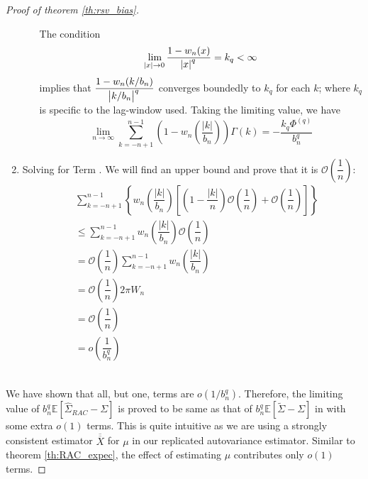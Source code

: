 \documentclass[12pt]{article}
\newcommand*\circled[1]{\tikz[baseline=(char.base)]{
            \node[shape=circle,draw,inner sep=2pt] (char) {#1};}}
\begin{document}
\begin{proof}[Proof of theorem \ref{th:rsv_bias}]
\begin{enumerate}
\begin{enumerate}
     The condition 
     \[
     \lim_{\abs{x}\to 0}\dfrac{1 - w_n(x)}{\abs{x}^q} = k_q < \infty
     \]
     implies that $\dfrac{1-w_n(k/b_n)}{\abs{k/b_n}^q}$ converges boundedly to $k_q$ for each $k$; where $k_q$ is specific to the lag-window used. Taking the limiting value, we have
     \[
     \lim_{n \to \infty}\sum_{k = -n+1}^{n-1}\left(1-w_n\left(\dfrac{|k|}{b_n}\right)\right)\Gamma(k) = -\dfrac{k_q \Phi^{(q)}}{b_n^q}
     \]
\end{enumerate}

 \item Solving for Term \circled{\textbf{B}}. We will find an upper bound and prove that it is $\mathcal{O}\left(\dfrac{1}{n}\right)$:
 \begin{align*}
     & \sum_{k=-n+1}^{n-1}\left\{w_n\left(\dfrac{|k|}{b_n}\right)\left[\left(1-\dfrac{|k|}{n}\right)\mathcal{O}\left(\dfrac{1}{n}\right) + \mathcal{O}\left(\dfrac{1}{n}\right) \right] \right\} \\
     &\leq \sum_{k=-n+1}^{n-1}w_n\left(\dfrac{|k|}{b_n}\right)\mathcal{O}\left(\dfrac{1}{n}\right)\\
     &= \mathcal{O}\left(\dfrac{1}{n}\right) \sum_{k=-n+1}^{n-1}w_n\left(\dfrac{|k|}{b_n}\right) \\
     &= \mathcal{O}\left(\dfrac{1}{n}\right) 2\pi W_n \\
     &= \mathcal{O}\left(\dfrac{1}{n}\right) \\
     &= o\left(\dfrac{1}{b_n^q}\right) 
 \end{align*}
 \end{enumerate}  
 \\
 We have shown that all, but one, terms are $o(1/b_n^q)$. Therefore, the limiting value of $b_n^q\mathbb{E}[\hat{\Sigma}_{RAC} - \Sigma]$ is proved to be same as that of $b_n^q\mathbb{E}[\tilde{\Sigma} - \Sigma]$ in \cite{hannan2009multiple} with some extra $o(1)$ terms. This is quite intuitive as we are using a strongly consistent estimator $\overline{\overline{X}}$ for $\mu$ in our replicated autovariance estimator. Similar to theorem \ref{th:RAC_expec}, the effect of estimating $\mu$ contributes only $o(1)$ terms. 
\end{proof}
\end{document}
